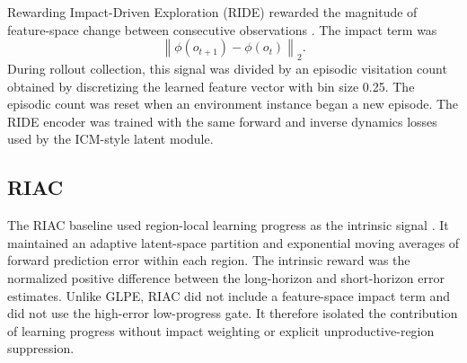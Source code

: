 Rewarding Impact-Driven Exploration (RIDE) rewarded the magnitude of feature-space change between consecutive observations \parencite{raileanu-2020}.
The impact term was
\begin{equation}
    \left\lVert \phi(o_{t+1})-\phi(o_t)\right\rVert_2.
\end{equation}
During rollout collection, this signal was divided by an episodic visitation count obtained by discretizing the learned feature vector with bin size 0.25.
The episodic count was reset when an environment instance began a new episode.
The RIDE encoder was trained with the same forward and inverse dynamics losses used by the ICM-style latent module.

\subsection{RIAC}
\label{subsec:methodology_baseline_riac}

The RIAC baseline used region-local learning progress as the intrinsic signal \parencite{baranes-2009}.
It maintained an adaptive latent-space partition and exponential moving averages of forward prediction error within each region.
The intrinsic reward was the normalized positive difference between the long-horizon and short-horizon error estimates.
Unlike GLPE, RIAC did not include a feature-space impact term and did not use the high-error low-progress gate.
It therefore isolated the contribution of learning progress without impact weighting or explicit unproductive-region suppression.